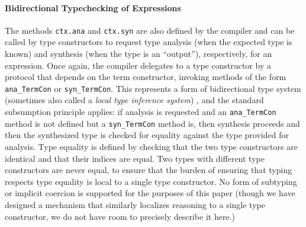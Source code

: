 \documentclass[9pt,preprint]{sigplanconf}
\newcommand{\lstinlinep}[1]{\lstinline[language=Python,basicstyle=\ttfamily\small]{#1}}
\begin{document}

\paragraph{Bidirectional Typechecking of Expressions} The methods \lstinlinep{ctx.ana} and \lstinlinep{ctx.syn} are also defined by the compiler and can be called by type constructors to request type analysis (when the expected type is known) and synthesis (when the type is an ``output''), respectively, for an expression. Once again, the compiler delegates to a type constructor by a protocol that depends on the term constructor, invoking methods of the form \lstinlinep{ana_TermCon} or \lstinlinep{syn_TermCon}. This represents a form of bidirectional type system (sometimes also called a \emph{local type inference system}) \cite{Pierce:2000:LTI:345099.345100}, and the standard subsumption principle applies: if analysis is requested and an \lstinlinep{ana_TermCon} method is not defined but a \lstinlinep{syn_TermCon} method is, then synthesis proceeds and then the synthesized type is checked for equality against the type provided for analysis. Type equality is defined by checking that the two type constructors are identical and that their indices are equal. Two types with different type constructors are never equal, to ensure that the burden of ensuring that typing respects type equality is local to a single type constructor.  No form of subtyping or implicit coercion is supported for the purposes of this paper (though we have designed a mechanism that similarly localizes reasoning to a single type constructor, we do not have room to precisely describe it here.)
\end{document}
